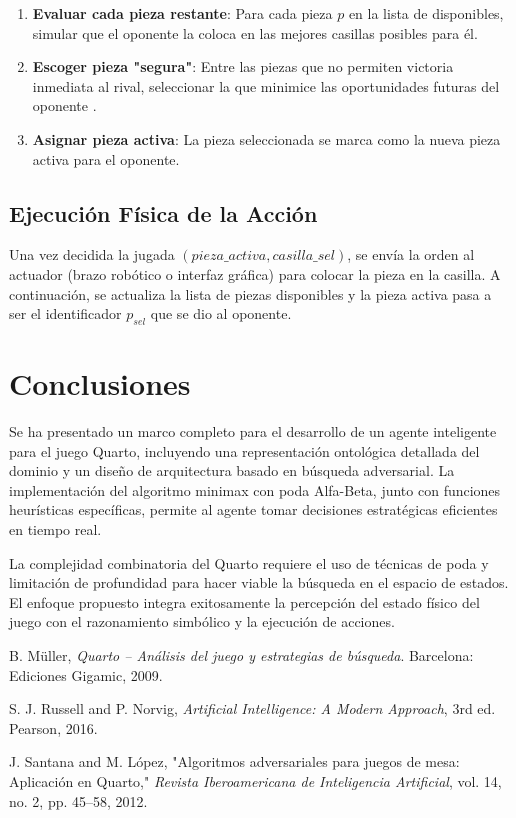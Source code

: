 \documentclass[conference]{IEEEtran}
\begin{document}
\begin{enumerate}
\item \textbf{Evaluar cada pieza restante}: Para cada pieza $p$ en la lista de disponibles, simular que el oponente la coloca en las mejores casillas posibles para él.
\item \textbf{Escoger pieza "segura"}: Entre las piezas que no permiten victoria inmediata al rival, seleccionar la que minimice las oportunidades futuras del oponente \cite{santana2012}.
\item \textbf{Asignar pieza activa}: La pieza seleccionada se marca como la nueva pieza activa para el oponente.
\end{enumerate}

\subsection{Ejecución Física de la Acción}

Una vez decidida la jugada $(pieza\_activa, casilla\_sel)$, se envía la orden al actuador (brazo robótico o interfaz gráfica) para colocar la pieza en la casilla. A continuación, se actualiza la lista de piezas disponibles y la pieza activa pasa a ser el identificador $p_{sel}$ que se dio al oponente.

\section{Conclusiones}

Se ha presentado un marco completo para el desarrollo de un agente inteligente para el juego Quarto, incluyendo una representación ontológica detallada del dominio y un diseño de arquitectura basado en búsqueda adversarial. La implementación del algoritmo minimax con poda Alfa-Beta, junto con funciones heurísticas específicas, permite al agente tomar decisiones estratégicas eficientes en tiempo real.

La complejidad combinatoria del Quarto requiere el uso de técnicas de poda y limitación de profundidad para hacer viable la búsqueda en el espacio de estados. El enfoque propuesto integra exitosamente la percepción del estado físico del juego con el razonamiento simbólico y la ejecución de acciones.

\begin{thebibliography}{9}

B. Müller, \textit{Quarto – Análisis del juego y estrategias de búsqueda}. Barcelona: Ediciones Gigamic, 2009.

S. J. Russell and P. Norvig, \textit{Artificial Intelligence: A Modern Approach}, 3rd ed. Pearson, 2016.

J. Santana and M. López, "Algoritmos adversariales para juegos de mesa: Aplicación en Quarto," \textit{Revista Iberoamericana de Inteligencia Artificial}, vol. 14, no. 2, pp. 45–58, 2012.

\end{thebibliography}
\end{document}
